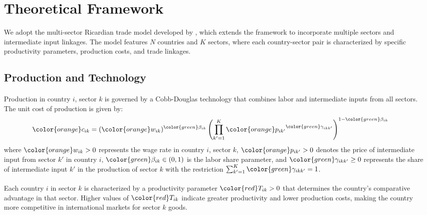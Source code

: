 \section{Theoretical Framework}

\paragraph{} We adopt the multi-sector Ricardian trade model developed by \cite{costinot2012TheReviewofEconomicStudies}, which extends the \cite{eaton2002Econometrica} framework to incorporate multiple sectors and intermediate input linkages. The model features $N$ countries and $K$ sectors, where each country-sector pair is characterized by specific productivity parameters, production costs, and trade linkages.

\subsection{Production and Technology}

\paragraph{} Production in country $i$, sector $k$ is governed by a Cobb-Douglas technology that combines labor and intermediate inputs from all sectors. The unit cost of production is given by:
\begin{align*}
    {\color{orange}c_{ik}} &= ({\color{orange}w_{ik}})^{{\color{green}\beta_{ik}}} \left(\prod_{k'=1}^{K} {\color{orange}p_{ik'}}^{{\color{green}\gamma_{ikk'}}}\right)^{1 - {\color{green}\beta_{ik}}}
\end{align*}
where ${\color{orange}w_{ik}} > 0$ represents the wage rate in country $i$, sector $k$, ${\color{orange}p_{ik'}} > 0$ denotes the price of intermediate input from sector $k'$ in country $i$, ${\color{green}\beta_{ik}} \in (0,1)$ is the labor share parameter, and ${\color{green}\gamma_{ikk'}} \geq 0$ represents the share of intermediate input $k'$ in the production of sector $k$ with the restriction $\sum_{k'=1}^{K} {\color{green}\gamma_{ikk'}} = 1$. 

\paragraph{} Each country $i$ in sector $k$ is characterized by a productivity parameter ${\color{red}T_{ik}} > 0$ that determines the country's comparative advantage in that sector. Higher values of ${\color{red}T_{ik}}$ indicate greater productivity and lower production costs, making the country more competitive in international markets for sector $k$ goods.

